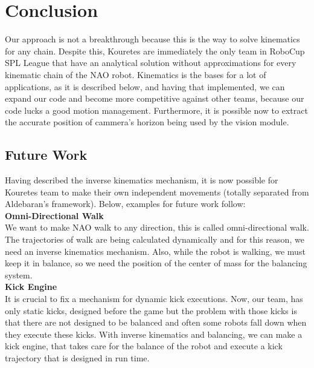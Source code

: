 \chapter{Conclusion}
\label{conclusion}
Our approach is not a breakthrough because this is the way to solve kinematics for any chain. Despite this, Kouretes are immediately the only team in RoboCup SPL League that have an analytical solution without approximations for every kinematic chain of the NAO robot. Kinematics is the bases for a lot of applications, as it is described below, and having that implemented, we can expand our code and become more competitive against other teams, because our code lucks a good motion management. Furthermore, it is possible now to extract the accurate position of cammera's horizon being used by the vision module.  
\section{Future Work}
Having described the inverse kinematics mechanism, it is now possible for Kouretes team to make their own independent movements (totally separated from Aldebaran's framework). Below, examples for future work follow:\\

\textbf{Omni-Directional Walk}\\
We want to make NAO walk to any direction, this is called omni-directional walk. The trajectories of walk are being calculated dynamically and for this reason, we need an inverse kinematics mechanism. Also, while the robot is walking, we must keep it in balance, so we need the position of the center of mass for the balancing system.\\

\textbf{Kick Engine}\\
It is crucial to fix a mechanism for dynamic kick executions. Now, our team, has only static kicks, designed before the game but the problem with those kicks is that there are not designed to be balanced and often some robots fall down when they execute these kicks. With inverse kinematics and balancing, we can make a kick engine, that takes care for the balance of the robot and execute a kick trajectory that is designed in run time.